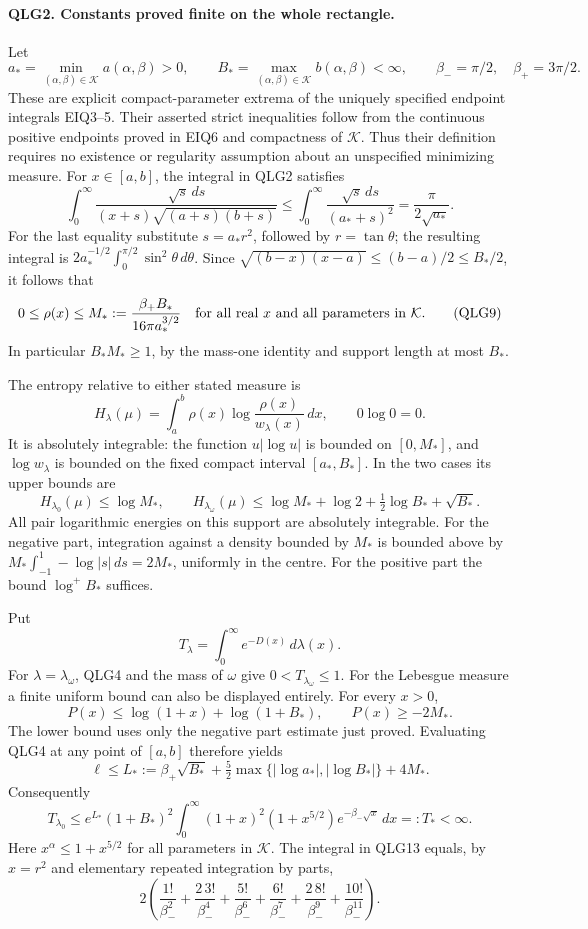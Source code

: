 \documentclass[11pt,a4paper]{article}
\begin{document}
\paragraph{QLG2. Constants proved finite on the whole rectangle.}
Let
\[
 a_* =\min_{(\alpha,\beta)\in\mathcal K} a(\alpha,\beta)>0,
 \qquad B_* =\max_{(\alpha,\beta)\in\mathcal K} b(\alpha,\beta)<\infty,
 \qquad \beta_-=\pi/2,\quad\beta_+=3\pi/2.
 \tag{QLG8}
\]
These are explicit compact-parameter extrema of the uniquely specified
endpoint integrals EIQ3--5. Their asserted strict inequalities follow
from the continuous positive endpoints proved in EIQ6 and compactness
of \(\mathcal K\). Thus their definition requires no existence or
regularity assumption about an unspecified minimizing measure.
For \(x\in[a,b]\), the integral in QLG2 satisfies
\[
 \int_0^\infty\frac{\sqrt{s}\,ds}{(x+s)\sqrt{(a+s)(b+s)}}
 \leq\int_0^\infty\frac{\sqrt{s}\,ds}{(a_*+s)^2}
 =\frac{\pi}{2\sqrt{a_*}}.
\]
For the last equality substitute \(s=a_*r^2\), followed by
\(r=\tan\theta\); the resulting integral is
\(2a_*^{-1/2}\int_0^{\pi/2}\sin^2\theta\,d\theta\).
Since \(\sqrt{(b-x)(x-a)}\leq(b-a)/2\leq B_*/2\), it follows that
\[
 0\leq\rho(x)\leq M_*:=\frac{\beta_+B_*}{16\pi a_*^{3/2}}
       \quad\hbox{for all real }x\hbox{ and all parameters in }\mathcal K.
 \tag{QLG9}
\]
In particular \(B_*M_*\geq1\), by the mass-one identity and support
length at most \(B_*\).

The entropy relative to either stated measure is
\[
 H_\lambda(\mu)=\int_a^b
                 \rho(x)\log\frac{\rho(x)}{w_\lambda(x)}\,dx,
       \qquad 0\log0=0.
 \tag{QLG10}
\]
It is absolutely integrable: the function \(u|\log u|\) is bounded
on \([0,M_*]\), and \(\log w_\lambda\) is bounded on the fixed
compact interval \([a_*,B_*]\). In the two cases its upper bounds are
\[
 H_{\lambda_0}(\mu)\leq\log M_* ,\qquad
 H_{\lambda_\omega}(\mu)\leq
 \log M_*+\log2+\tfrac12\log B_*+\sqrt{B_*}.
 \tag{QLG11}
\]
All pair logarithmic energies on this support are absolutely
integrable. For the negative part, integration against a density
bounded by \(M_*\) is bounded above by
\(M_*\int_{-1}^1-\log|s|\,ds=2M_*\), uniformly in the centre.
For the positive part the bound \(\log^+ B_*\) suffices.

Put
\[
 T_\lambda=\int_0^\infty e^{-D(x)}\,d\lambda(x).
 \tag{QLG12}
\]
For \(\lambda=\lambda_\omega\), QLG4 and the mass of \(\omega\)
give \(0<T_{\lambda_\omega}\leq1\). For the Lebesgue measure a finite
uniform bound can also be displayed entirely. For every \(x>0\),
\[
 P(x)\leq\log(1+x)+\log(1+B_*),\qquad P(x)\geq-2M_*.
\]
The lower bound uses only the negative part estimate just proved.
Evaluating QLG4 at any point of \([a,b]\) therefore yields
\[
 \ell\leq L_*:=\beta_+\sqrt{B_*}
    +\tfrac52\max\{|\log a_*|,|\log B_*|\}+4M_*.
\]
Consequently
\[
 T_{\lambda_0}\leq e^{L_*}(1+B_*)^2
    \int_0^\infty (1+x)^2(1+x^{5/2})e^{-\beta_-\sqrt{x}}\,dx
    =:T_*<\infty.
 \tag{QLG13}
\]
Here \(x^\alpha\leq1+x^{5/2}\) for all parameters in \(\mathcal K\).
The integral in QLG13 equals, by \(x=r^2\) and elementary repeated
integration by parts,
\[
 2\left(\frac{1!}{\beta_-^2}
       +\frac{2\,3!}{\beta_-^4}
       +\frac{5!}{\beta_-^6}
       +\frac{6!}{\beta_-^7}
       +\frac{2\,8!}{\beta_-^9}
       +\frac{10!}{\beta_-^{11}}\right).
 \tag{QLG14}
\]
\end{document}

